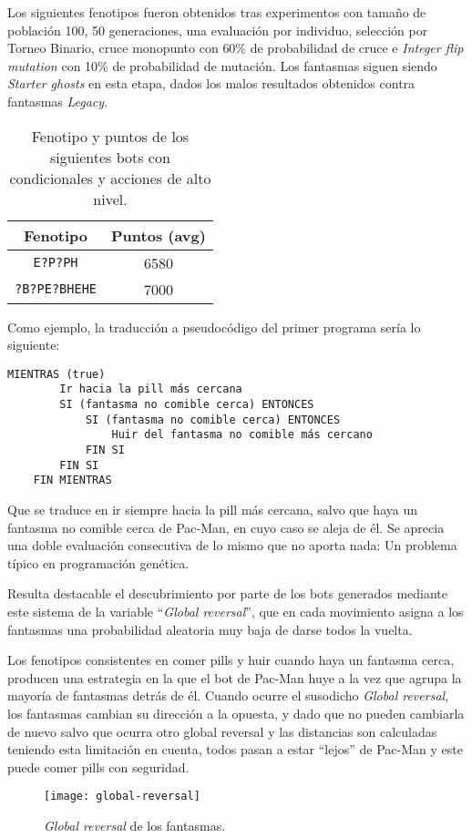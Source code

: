 Los siguientes fenotipos fueron obtenidos tras experimentos con tamaño de población 100, 50 generaciones, una evaluación por individuo, selección por Torneo Binario, cruce monopunto con 60\% de probabilidad de cruce e \textit{Integer flip mutation} con 10\% de probabilidad de mutación. Los fantasmas siguen siendo \textit{Starter ghosts} en esta etapa, dados los malos resultados obtenidos contra fantasmas \textit{Legacy}.
\begin{table}[H]
\centering
\begin{tabular}{cc}
\hline
\textbf{Fenotipo} & \textbf{Puntos (avg)} \\ \hline
\texttt{E?P?PH}          & 6580                  \\
\texttt{?B?PE?BHEHE}          & 7000                  \\ \hline
\end{tabular}
\caption{Fenotipo y puntos de los siguientes bots con condicionales y acciones de alto nivel.}
\end{table}

Como ejemplo, la traducción a pseudocódigo del primer programa sería lo siguiente:
\begin{lstlisting}[frame=single, breaklines=no, basicstyle=\fontsize{10}{11}\ttfamily, caption=Pseudocódigo correspondiente al programa \texttt{E?P?PH}, captionpos=b]
    MIENTRAS (true)
        Ir hacia la pill más cercana
        SI (fantasma no comible cerca) ENTONCES
            SI (fantasma no comible cerca) ENTONCES
                Huir del fantasma no comible más cercano
            FIN SI
        FIN SI
    FIN MIENTRAS
\end{lstlisting}

Que se traduce en ir siempre hacia la pill más cercana, salvo que haya un fantasma no comible cerca de Pac-Man, en cuyo caso se aleja de él. Se aprecia una doble evaluación consecutiva de lo mismo que no aporta nada: Un problema típico en programación genética. 

\blankline

Resulta destacable el descubrimiento por parte de los bots generados mediante este sistema de la variable ``\textit{Global reversal}'', que en cada movimiento asigna a los fantasmas una probabilidad aleatoria muy baja de darse todos la vuelta.
 
Los fenotipos consistentes en comer pills y huir cuando haya un fantasma cerca, producen una estrategia en la que el bot de Pac-Man huye a la vez que agrupa la mayoría de fantasmas detrás de él. Cuando ocurre el susodicho \textit{Global reversal}, los fantasmas cambian su dirección a la opuesta, y dado que no pueden cambiarla de nuevo salvo que ocurra otro global reversal y las distancias son calculadas teniendo esta limitación en cuenta, todos pasan a estar ``lejos'' de Pac-Man y este puede comer pills con seguridad.
\begin{figure}[H]
\centering
\texttt{[image: global-reversal]}
\caption{\textit{Global reversal} de los fantasmas.}
\end{figure}

